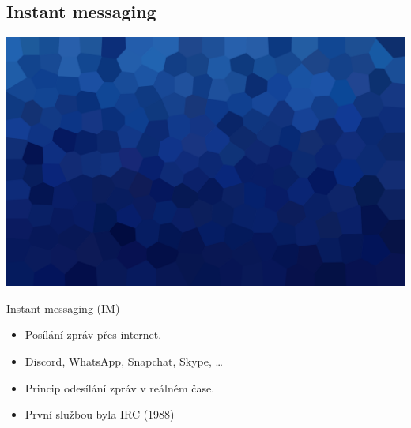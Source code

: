 \documentclass[aspectratio=169,xcolor=dvipsnames, t]{beamer}
\begin{document}
\subsection{Instant messaging}
{
    \includegraphics[width=\paperwidth,height=\paperheight]{AICStyleData/logos/mene_polygonu_bg.png}
}
\begin{frame}{Instant messaging (IM)}
    \begin{itemize}
        \item Posílání zpráv přes internet.
        \item Discord, WhatsApp, Snapchat, Skype, \ldots
        \item Princip odesílání zpráv v reálném čase.
        \item První službou byla IRC (1988)
    \end{itemize}
\end{frame}
\end{document}
